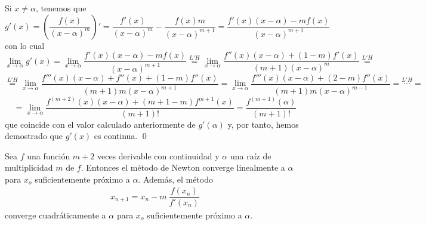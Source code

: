 \begin{dem}
        Si $x\neq \alpha$, tenemos que
        $$g'(x)=\left(\dfrac{f(x)}{(x-\alpha)^m}\right)'=\dfrac{f'(x)}{(x-\alpha)^m}-\dfrac{f(x)m}{(x-\alpha)^{m+1}}=\dfrac{f'(x) (x-\alpha)-m f(x)}{(x-\alpha)^{m+1}}$$
        con lo cual
        $$\lim_{x\to\alpha}g'(x)=\lim_{x\to\alpha}\dfrac{f'(x) (x-\alpha)-m f(x)}{(x-\alpha)^{m+1}}\overset{L'H}{=}  \lim_{x\to\alpha}\dfrac{f''(x)(x-\alpha)+(1-m)f'(x)}{(m+1)(x-\alpha)^m}\overset{L'H}{=}$$
        $$\overset{L'H}{=} \lim_{x \to \alpha} \dfrac{f'''(x)(x-\alpha)+f''(x)+(1-m)f''(x)}{(m+1)m (x-\alpha)^{m+1}}=\lim_{x \to \alpha}\dfrac{f'''(x)(x-\alpha)+(2-m)f''(x)}{(m+1)m(x-\alpha)^{m-1}}= \overset{L'H}{\cdots} = $$
        $$= \lim_{x \to \alpha} \dfrac{f^{(m+2)}(x)(x-\alpha) + (m+1-m)f^{m+1}(x)}{(m+1)!}=\dfrac{f^{(m+1)}(\alpha)}{(m+1)!}$$
        que coincide con el valor calculado anteriormente de $g'(\alpha)$ y, por tanto, hemos demostrado que $g'(x)$ es continua.
        \qed\end{dem}
        \begin{teo}
            Sea $f$ una función $m+2$ veces derivable con continuidad y $\alpha$ una raíz de multiplicidad $m$ de $f$. Entonces el método de Newton converge linealmente a $\alpha$ para $x_o$ suficientemente próximo a $\alpha$.  Además, el método
            \begin{align}
              x_{n+1}=x_n-m\: \dfrac{f(x_n)}{f'(x_n)}
              \label{met:newtonm}
            \end{align}
            converge cuadráticamente a $\alpha$ para $x_o$ suficientemente próximo a $\alpha$.
        \end{teo}
